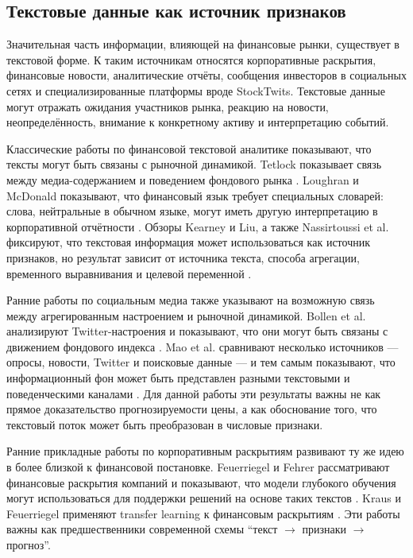 \subsection{Текстовые данные как источник признаков}

Значительная часть информации, влияющей на финансовые рынки, существует в текстовой форме. К таким источникам относятся корпоративные раскрытия, финансовые новости, аналитические отчёты, сообщения инвесторов в социальных сетях и специализированные платформы вроде StockTwits. Текстовые данные могут отражать ожидания участников рынка, реакцию на новости, неопределённость, внимание к конкретному активу и интерпретацию событий.

Классические работы по финансовой текстовой аналитике показывают, что тексты могут быть связаны с рыночной динамикой. Tetlock показывает связь между медиа-содержанием и поведением фондового рынка \cite{tetlock2007media}. Loughran и McDonald показывают, что финансовый язык требует специальных словарей: слова, нейтральные в обычном языке, могут иметь другую интерпретацию в корпоративной отчётности \cite{loughran2011liability}. Обзоры Kearney и Liu, а также Nassirtoussi et al. фиксируют, что текстовая информация может использоваться как источник признаков, но результат зависит от источника текста, способа агрегации, временного выравнивания и целевой переменной \cite{kearney2014textual,nassirtoussi2014text}.

Ранние работы по социальным медиа также указывают на возможную связь между агрегированным настроением и рыночной динамикой. Bollen et al. анализируют Twitter-настроения и показывают, что они могут быть связаны с движением фондового индекса \cite{bollen2011twitter}. Mao et al. сравнивают несколько источников --- опросы, новости, Twitter и поисковые данные --- и тем самым показывают, что информационный фон может быть представлен разными текстовыми и поведенческими каналами \cite{mao2011sentiment}. Для данной работы эти результаты важны не как прямое доказательство прогнозируемости цены, а как обоснование того, что текстовый поток может быть преобразован в числовые признаки.

Ранние прикладные работы по корпоративным раскрытиям развивают ту же идею в более близкой к финансовой постановке. Feuerriegel и Fehrer рассматривают финансовые раскрытия компаний и показывают, что модели глубокого обучения могут использоваться для поддержки решений на основе таких текстов \cite{feuerriegel2015disclosures}. Kraus и Feuerriegel применяют transfer learning к финансовым раскрытиям \cite{kraus2017financialdisclosures}. Эти работы важны как предшественники современной схемы ``текст $\rightarrow$ признаки $\rightarrow$ прогноз''.

